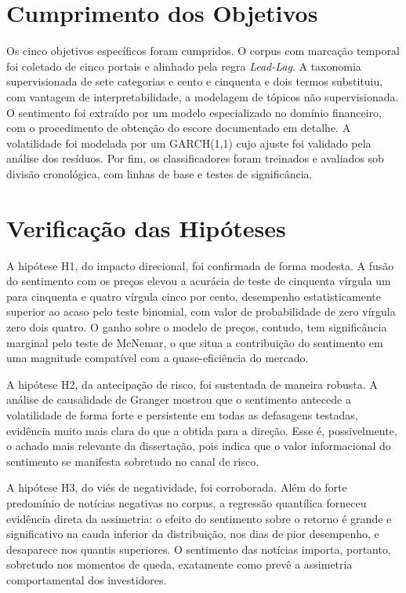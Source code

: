 \section{Cumprimento dos Objetivos}

Os cinco objetivos específicos foram cumpridos. O corpus com marcação temporal foi coletado de cinco portais e alinhado pela regra \textit{Lead-Lag}. A taxonomia supervisionada de sete categorias e cento e cinquenta e dois termos substituiu, com vantagem de interpretabilidade, a modelagem de tópicos não supervisionada. O sentimento foi extraído por um modelo especializado no domínio financeiro, com o procedimento de obtenção do escore documentado em detalhe. A volatilidade foi modelada por um GARCH(1,1) cujo ajuste foi validado pela análise dos resíduos. Por fim, os classificadores foram treinados e avaliados sob divisão cronológica, com linhas de base e testes de significância.

\section{Verificação das Hipóteses}

A hipótese H1, do impacto direcional, foi confirmada de forma modesta. A fusão do sentimento com os preços elevou a acurácia de teste de cinquenta vírgula um para cinquenta e quatro vírgula cinco por cento, desempenho estatisticamente superior ao acaso pelo teste binomial, com valor de probabilidade de zero vírgula zero dois quatro. O ganho sobre o modelo de preços, contudo, tem significância marginal pelo teste de McNemar, o que situa a contribuição do sentimento em uma magnitude compatível com a quase-eficiência do mercado.

A hipótese H2, da antecipação de risco, foi sustentada de maneira robusta. A análise de causalidade de Granger mostrou que o sentimento antecede a volatilidade de forma forte e persistente em todas as defasagens testadas, evidência muito mais clara do que a obtida para a direção. Esse é, possivelmente, o achado mais relevante da dissertação, pois indica que o valor informacional do sentimento se manifesta sobretudo no canal de risco.

A hipótese H3, do viés de negatividade, foi corroborada. Além do forte predomínio de notícias negativas no corpus, a regressão quantílica forneceu evidência direta da assimetria: o efeito do sentimento sobre o retorno é grande e significativo na cauda inferior da distribuição, nos dias de pior desempenho, e desaparece nos quantis superiores. O sentimento das notícias importa, portanto, sobretudo nos momentos de queda, exatamente como prevê a assimetria comportamental dos investidores.

